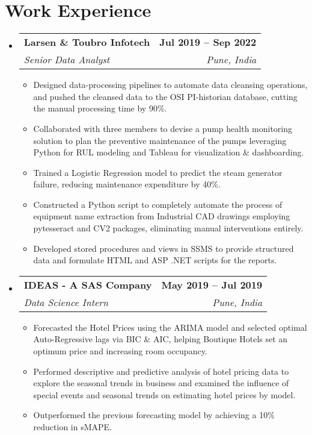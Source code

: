 \documentclass[letterpaper,11pt]{article}
\makeatletter
\newcommand{\resumeItem}[1]{
  \item\small{
    {#1 \vspace{-2pt}}
  }
}
\newcommand{\resumeSubheading}[4]{
  \vspace{-2pt}\item
    \begin{tabular*}{1.0\textwidth}[t]{l@{\extracolsep{\fill}}r}
      \textbf{#1} & \textbf{\small #2} \\
      \textit{\small#3} & \textit{\small #4} \\
    \end{tabular*}\vspace{-7pt}
}
\newcommand{\resumeSubHeadingListStart}{\begin{itemize}[leftmargin=0.0in, label={}]}
\newcommand{\resumeSubHeadingListEnd}{\end{itemize}}
\newcommand{\resumeItemListStart}{\begin{itemize}}
\newcommand{\resumeItemListEnd}{\end{itemize}\vspace{-5pt}}
\makeatother
\begin{document}
\section{Work Experience}
  \resumeSubHeadingListStart

    \resumeSubheading
      {Larsen \& Toubro Infotech}{Jul 2019 -- Sep 2022}
      {Senior Data Analyst}{Pune, India}
      \resumeItemListStart
        \resumeItem{Designed data-processing pipelines to automate data cleansing operations, and pushed the cleansed data to the OSI PI-historian database, cutting the manual processing time by 90\%.}
        \resumeItem{Collaborated with three members to devise a pump health monitoring solution to plan the preventive maintenance of the pumps leveraging Python for RUL modeling and Tableau for visualization \& dashboarding.}
        \resumeItem{Trained a Logistic Regression model to predict the steam generator failure, reducing maintenance expenditure by 40\%.}
        \resumeItem{Constructed a Python script to completely automate the process of equipment name extraction from Industrial CAD drawings employing pytesseract and CV2 packages, eliminating manual interventions entirely.}
        \resumeItem{Developed stored procedures and views in SSMS to provide structured data and formulate HTML and ASP .NET scripts for the reports.}
      \resumeItemListEnd

    \resumeSubheading
      {IDEAS - A SAS Company}{May 2019 -- Jul 2019}
      {Data Science Intern}{Pune, India}
      \resumeItemListStart
        \resumeItem{Forecasted the Hotel Prices using the ARIMA model and selected optimal Auto-Regressive lags via BIC \& AIC, helping Boutique Hotels set an optimum price and increasing room occupancy.}
        \resumeItem{Performed descriptive and predictive analysis of hotel pricing data to explore the seasonal trends in business and examined the influence of special events and seasonal trends on estimating hotel prices by model.}
        \resumeItem{Outperformed the previous forecasting model by achieving a 10\% reduction in sMAPE.}
        
    \resumeItemListEnd
    
  \resumeSubHeadingListEnd
\vspace{-16pt}
\end{document}
